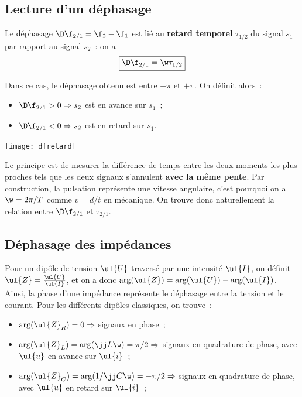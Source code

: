\documentclass[../main/main.tex]{subfiles}
\begin{document}
\subsection{Lecture d'un déphasage}
Le déphasage $\D\f_{2/1} = \f_2 - \f_1$ est lié au \textbf{retard temporel}
$\tau_{1/2}$ du signal $s_1$ par rapport au signal $s_2$~: on a
\[\boxed{\D\f_{2/1} = \w\tau_{1/2}}\]

\begin{minipage}{0.70\linewidth}
    Dans ce cas, le déphasage obtenu est entre $-\pi$ et $+\pi$. On définit alors~:
    \begin{itemize}
        \item $\D\f_{2/1} > 0 \Rightarrow s_2$ est en avance sur $s_1$~;
        \item $\D\f_{2/1} < 0 \Rightarrow s_2$ est en retard sur $s_1$.
    \end{itemize}
\end{minipage}
\begin{minipage}{0.30\linewidth}
    \begin{center}
        \texttt{[image: dfretard]}
    \end{center}
\end{minipage}

Le principe est de mesurer la différence de temps entre les deux moments les
plus proches tels que les deux signaux s'annulent \textbf{avec la même pente}.
Par construction, la pulsation représente une vitesse angulaire, c'est pourquoi
on a $\w = 2\pi/T$ comme $v = d/t$ en mécanique. On trouve donc naturellement la
relation entre $\D\f_{2/1}$ et $\tau_{2/1}$.

\subsection{Déphasage des impédances}
Pour un dipôle de tension $\ul{U}$ traversé par une intensité $\ul{I}$, on
définit $\ul{Z} = \frac{\ul{U}}{\ul{I}}$, et on a donc $\arg(\ul{Z}) =
\arg(\ul{U}) - \arg(\ul{I})$. Ainsi, la phase d'une impédance représente le
déphasage entre la tension et le courant. Pour les différents dipôles
classiques, on trouve~:
\begin{itemize}
    \item $\arg(\ul{Z}_R) = 0 \Rightarrow$ signaux en phase~;
    \item $\arg(\ul{Z}_L) = \arg(\jj L\w) = \pi/2 \Rightarrow$ signaux en
        quadrature de phase, avec $\ul{u}$ en avance sur $\ul{i}$~;
    \item $\arg(\ul{Z}_C) = \arg(1/\jj C\w) = -\pi/2 \Rightarrow$ signaux en
        quadrature de phase, avec $\ul{u}$ en retard sur $\ul{i}$~;
\end{itemize}
\end{document}
